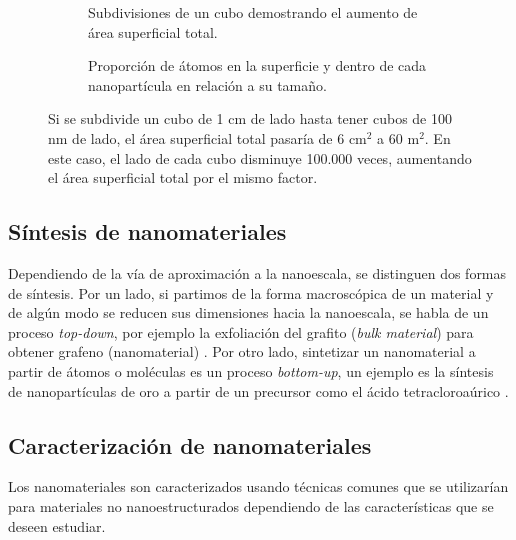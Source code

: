\begin{figure}[h!]
	\centering
	\begin{subfigure}{\textwidth}
		\caption[Subdivisiones de un cubo demostrando el aumento de área superficial total]{Subdivisiones de un cubo demostrando el aumento de área superficial total.}
		\label{fig:area_cubes}
	\end{subfigure}
	\begin{subfigure}{\textwidth}
			\caption{Proporción de átomos en la superficie y dentro de cada nanopartícula en relación a su tamaño.}
			\label{fig:graph_nanocube}
	\end{subfigure}
	\caption[Aumento de área superficial y proporción de átomos en superficie al disminuir el tamaño de las nanopartículas]{Si se subdivide un cubo de 1 cm de lado hasta tener cubos de 100 nm de lado, el área superficial total pasaría de 6 $\mathrm{cm^2}$ a 60 $\mathrm{m^2}$. En este caso, el lado de cada cubo disminuye 100.000 veces, aumentando el área superficial total por el mismo factor.}
\end{figure}

\subsection*{Síntesis de nanomateriales}
Dependiendo de la vía de aproximación a la nanoescala, se distinguen dos formas de síntesis. Por un lado, si partimos de la forma macroscópica de un material y de algún modo se reducen sus dimensiones hacia la nanoescala, se habla de un proceso \textit{top-down}, por ejemplo la exfoliación del grafito (\textit{bulk material}) para obtener grafeno (nanomaterial) \citep{Novoselov2004}.  Por otro lado, sintetizar un nanomaterial a partir de átomos o moléculas es un proceso \textit{bottom-up}, un ejemplo es la síntesis de nanopartículas de oro a partir de un precursor como el ácido tetracloroaúrico \citep{Daniel2004}.

\subsection*{Caracterización de nanomateriales}
Los nanomateriales son caracterizados usando técnicas comunes que se utilizarían para materiales no nanoestructurados dependiendo de las características que se deseen estudiar.
